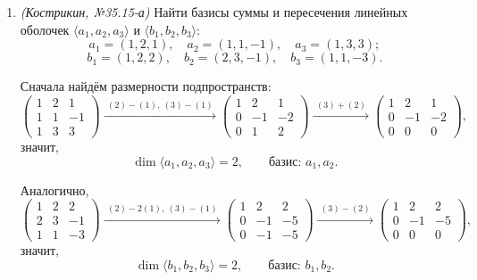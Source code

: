 \begin{enumerate}
Представим
\[
x=\alpha_1u_1+\alpha_2u_2+\beta_1v_1+\beta_2v_2.
\]
Решение соответствующей системы даёт
\[
\alpha_1=1,\qquad \alpha_2=2,\qquad \beta_1=3,\qquad \beta_2=4.
\]

Тогда проекция на $U$ параллельно $V$ равна
\[
\operatorname{pr}_U^V x=\alpha_1u_1+\alpha_2u_2
=\begin{pmatrix}-1\\-3\\1\\3\end{pmatrix}.
\]

\item \textit{(Кострикин, №35.15-а)} Найти базисы суммы и пересечения линейных оболочек $\langle a_1, a_2, a_3 \rangle$ и $\langle b_1, b_2, b_3 \rangle$:
\[
a_1 = (1, 2, 1), \quad a_2 = (1, 1, -1), \quad a_3 = (1, 3, 3);
\]
\[
b_1 = (1, 2, 2), \quad b_2 = (2, 3, -1), \quad b_3 = (1, 1, -3).
\]

Сначала найдём размерности подпространств:
\[
\begin{pmatrix}
    1 & 2 & 1 \\
    1 & 1 & -1 \\
    1 & 3 & 3
\end{pmatrix}
\xrightarrow{\,\, (2)-(1),\ (3)-(1) \,\,}
\begin{pmatrix}
    1 & 2 & 1 \\
    0 & -1 & -2 \\
    0 & 1 & 2
\end{pmatrix}
\xrightarrow{\,\, (3)+(2) \,\,}
\begin{pmatrix}
    1 & 2 & 1 \\
    0 & -1 & -2 \\
    0 & 0 & 0
\end{pmatrix},
\]
значит,
\[
\dim\langle a_1,a_2,a_3\rangle=2,
\qquad
\text{базис: } a_1,a_2.
\]

Аналогично,
\[
\begin{pmatrix}
    1 & 2 & 2 \\
    2 & 3 & -1 \\
    1 & 1 & -3
\end{pmatrix}
\xrightarrow{\,\, (2)-2(1),\ (3)-(1) \,\,}
\begin{pmatrix}
    1 & 2 & 2 \\
    0 & -1 & -5 \\
    0 & -1 & -5
\end{pmatrix}
\xrightarrow{\,\, (3)-(2) \,\,}
\begin{pmatrix}
    1 & 2 & 2 \\
    0 & -1 & -5 \\
    0 & 0 & 0
\end{pmatrix},
\]
значит,
\[
\dim\langle b_1,b_2,b_3\rangle=2,
\qquad
\text{базис: } b_1,b_2.
\]


\end{enumerate}
